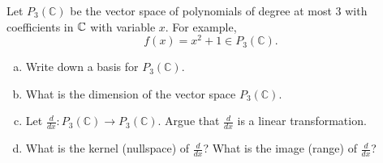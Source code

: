 \documentclass[12pt]{article} %
\begin{document}
\newpage
\begin{problem}
Let $P_3(\mathbb{C})$ be the vector space of polynomials of degree at most 3 with coefficients in $\mathbb{C}$ with variable $x$. For example,
\[
f(x)= x^2+1 \in P_3(\mathbb{C}).
\]
\begin{enumerate}[(a)]
    \item Write down a basis for $P_3(\mathbb{C})$.
    \item What is the dimension of the vector space $P_3(\mathbb{C})$.
    \item Let $\frac{d}{dx} \colon P_3(\mathbb{C}) \to P_3(\mathbb{C})$. Argue that $\frac{d}{dx}$ is a linear transformation.
    \item What is the kernel (nullspace) of $\frac{d}{dx}$? What is the image (range) of $\frac{d}{dx}$?
\end{enumerate}
\end{problem}
\end{document}

